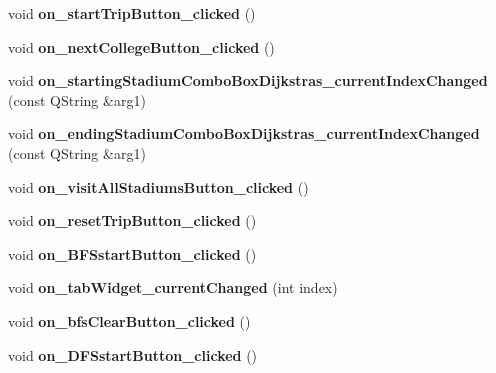 \begin{DoxyCompactItemize}
\item 
\mbox{\label{class_main_window_a1b0a71532f0f5e71a92907ecc66276ba}} 
void {\bfseries on\+\_\+start\+Trip\+Button\+\_\+clicked} ()
\item 
\mbox{\label{class_main_window_a04ec468348571e9dd5c3cdc0a34cd590}} 
void {\bfseries on\+\_\+next\+College\+Button\+\_\+clicked} ()
\item 
\mbox{\label{class_main_window_a48febb3456f23f978d69b6d1a0bd1676}} 
void {\bfseries on\+\_\+starting\+Stadium\+Combo\+Box\+Dijkstras\+\_\+current\+Index\+Changed} (const Q\+String \&arg1)
\item 
\mbox{\label{class_main_window_a8b38dc73a7ab40d56befb134d276e467}} 
void {\bfseries on\+\_\+ending\+Stadium\+Combo\+Box\+Dijkstras\+\_\+current\+Index\+Changed} (const Q\+String \&arg1)
\item 
\mbox{\label{class_main_window_a4e0e0ec958fcabd367a5094389b8d380}} 
void {\bfseries on\+\_\+visit\+All\+Stadiums\+Button\+\_\+clicked} ()
\item 
\mbox{\label{class_main_window_ad78a32b3aa8fae318e326a8a0f1ab9f5}} 
void {\bfseries on\+\_\+reset\+Trip\+Button\+\_\+clicked} ()
\item 
\mbox{\label{class_main_window_a78217438ec4b04b221c04a7b3d908469}} 
void {\bfseries on\+\_\+\+B\+F\+Sstart\+Button\+\_\+clicked} ()
\item 
\mbox{\label{class_main_window_ab5ec4a06e4e38781eb7b913fed92733e}} 
void {\bfseries on\+\_\+tab\+Widget\+\_\+current\+Changed} (int index)
\item 
\mbox{\label{class_main_window_aaec45c3a4a2a1c45f5123ff4dc972aff}} 
void {\bfseries on\+\_\+bfs\+Clear\+Button\+\_\+clicked} ()
\item 
\mbox{\label{class_main_window_a0356226f08ff14618a9a47d0c6ec59d4}} 
void {\bfseries on\+\_\+\+D\+F\+Sstart\+Button\+\_\+clicked} ()
\item 
\mbox{\label{class_main_window_acf0347e90497f15417d74ed9b2801944}} 

\end{DoxyCompactItemize}
